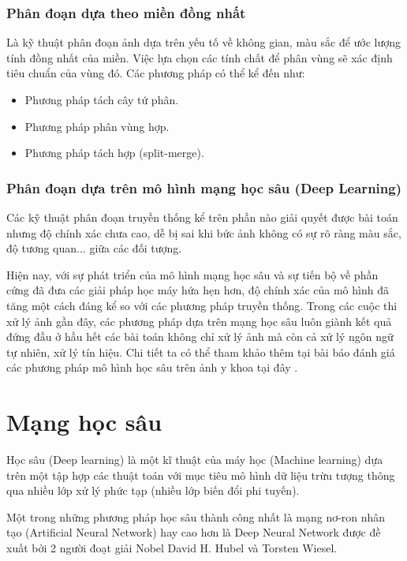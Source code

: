 \subsubsection{Phân đoạn dựa theo miền đồng nhất}
Là kỹ thuật phân đoạn ảnh dựa trên yếu tố về không gian, màu sắc để ước lượng tính đồng nhất của miền. Việc lựa chọn các tính chất để phân vùng sẽ xác định tiêu chuẩn của vùng đó.
Các phương pháp có thể kể đến như:
\begin{itemize}
	\item Phương pháp tách cây tứ phân.
	\item Phương pháp phân vùng hợp.
	\item Phương pháp tách hợp (split-merge).
\end{itemize}

\subsubsection{Phân đoạn dựa trên mô hình mạng học sâu (Deep Learning)}
Các kỹ thuật phân đoạn truyền thống kể trên phần nào giải quyết được bài toán nhưng độ chính xác chưa cao, dễ bị sai khi bức ảnh không có sự rõ ràng màu sắc, độ tương quan... giữa các đối tượng.\par 

Hiện nay, với sự phát triển của mô hình mạng học sâu và sự tiến bộ về phần cứng đã đưa các giải pháp học máy hứa hẹn hơn, độ chính xác của mô hình đã tăng một cách đáng kể so với các phương pháp truyền thống. Trong các cuộc thi xử lý ảnh gần đây, các phương pháp dựa trên mạng học sâu luôn giành kết quả đứng đầu ở hầu hết các bài toán không chỉ xử lý ảnh mà còn cả xử lý ngôn ngữ tự nhiên, xử lý tín hiệu. Chi tiết ta có thể tham khảo thêm tại bài báo đánh giá các phương pháp mô hình học sâu trên ảnh y khoa tại đây \cite{reviewDLmedical}.

\section{Mạng học sâu}
Học sâu (Deep learning) là một kĩ thuật của máy học (Machine learning) dựa trên một tập hợp các thuật toán với mục tiêu mô hình dữ liệu trừu tượng thông qua nhiều lớp xử lý phức tạp (nhiều lớp biến đổi phi tuyến).\par

Một trong những phương pháp học sâu thành công nhất là mạng nơ-ron nhân tạo (Artificial Neural Network) hay cao hơn là Deep Neural Network được đề xuất bởi 2 người đoạt giải Nobel David H. Hubel và Torsten Wiesel. \par

